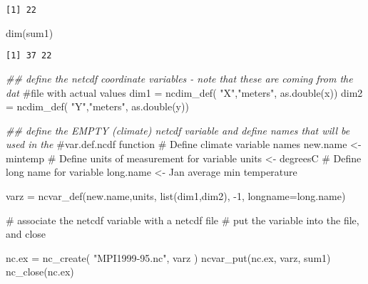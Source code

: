\documentclass[
  letterpaper,
]{book}
\newenvironment{Shaded}{\begin{snugshade}}{\end{snugshade}}
\newcommand{\AttributeTok}[1]{\textcolor[rgb]{0.40,0.45,0.13}{#1}}
\newcommand{\CommentTok}[1]{\textcolor[rgb]{0.37,0.37,0.37}{#1}}
\newcommand{\DecValTok}[1]{\textcolor[rgb]{0.68,0.00,0.00}{#1}}
\newcommand{\DocumentationTok}[1]{\textcolor[rgb]{0.37,0.37,0.37}{\textit{#1}}}
\newcommand{\FunctionTok}[1]{\textcolor[rgb]{0.28,0.35,0.67}{#1}}
\newcommand{\NormalTok}[1]{\textcolor[rgb]{0.00,0.23,0.31}{#1}}
\newcommand{\OtherTok}[1]{\textcolor[rgb]{0.00,0.23,0.31}{#1}}
\newcommand{\SpecialCharTok}[1]{\textcolor[rgb]{0.37,0.37,0.37}{#1}}
\newcommand{\StringTok}[1]{\textcolor[rgb]{0.13,0.47,0.30}{#1}}
\begin{document}
\begin{verbatim}
[1] 22
\end{verbatim}

\begin{Shaded}
\begin{Highlighting}[]
\FunctionTok{dim}\NormalTok{(sum1)}
\end{Highlighting}
\end{Shaded}

\begin{verbatim}
[1] 37 22
\end{verbatim}

\begin{Shaded}
\begin{Highlighting}[]
\DocumentationTok{\#\# define the netcdf coordinate variables {-} note that these are coming from the dat}
\CommentTok{\#file with actual values}
\NormalTok{dim1 }\OtherTok{=} \FunctionTok{ncdim\_def}\NormalTok{( }\StringTok{"X"}\NormalTok{,}\StringTok{"meters"}\NormalTok{, }\FunctionTok{as.double}\NormalTok{(x))}
\NormalTok{dim2 }\OtherTok{=} \FunctionTok{ncdim\_def}\NormalTok{( }\StringTok{"Y"}\NormalTok{,}\StringTok{"meters"}\NormalTok{, }\FunctionTok{as.double}\NormalTok{(y))}

\DocumentationTok{\#\# define the EMPTY (climate) netcdf variable and define names that will be used in the }
\CommentTok{\#var.def.ncdf function}
\CommentTok{\# Define climate variable names}
\NormalTok{    new.name }\OtherTok{\textless{}{-}} \StringTok{\textquotesingle{}mintemp\textquotesingle{}}
\CommentTok{\# Define units of measurement for variable}
\NormalTok{    units }\OtherTok{\textless{}{-}} \StringTok{\textquotesingle{}degreesC\textquotesingle{}}
\CommentTok{\# Define long name for variable}
\NormalTok{    long.name }\OtherTok{\textless{}{-}} \StringTok{\textquotesingle{}Jan average min temperature\textquotesingle{}}

\NormalTok{varz }\OtherTok{=} \FunctionTok{ncvar\_def}\NormalTok{(new.name,units, }\FunctionTok{list}\NormalTok{(dim1,dim2), }\SpecialCharTok{{-}}\DecValTok{1}\NormalTok{, }
          \AttributeTok{longname=}\NormalTok{long.name)}

\CommentTok{\# associate the netcdf variable with a netcdf file   }
\CommentTok{\# put the variable into the file, and close}

\NormalTok{nc.ex }\OtherTok{=} \FunctionTok{nc\_create}\NormalTok{( }\StringTok{"MPI1999{-}95.nc"}\NormalTok{, varz )}
\FunctionTok{ncvar\_put}\NormalTok{(nc.ex, varz, sum1)}
\FunctionTok{nc\_close}\NormalTok{(nc.ex)}
\end{Highlighting}
\end{Shaded}
\end{document}
